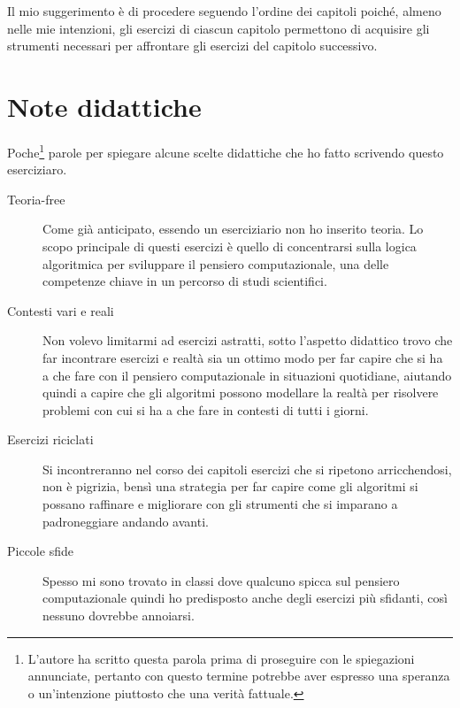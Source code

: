 Il mio suggerimento è di procedere seguendo l'ordine dei capitoli poiché, almeno nelle mie intenzioni, gli esercizi di ciascun capitolo permettono di acquisire gli strumenti necessari per affrontare gli esercizi del capitolo successivo.

\chapter*{Note didattiche}
Poche\footnote{L'autore ha scritto questa parola prima di proseguire con le spiegazioni annunciate, pertanto con questo termine potrebbe aver espresso una speranza o un'intenzione piuttosto che una verità fattuale.} parole per spiegare alcune scelte didattiche che ho fatto scrivendo questo eserciziaro.

\begin{description}
	\item[Teoria-free] Come già anticipato, essendo un eserciziario non ho inserito teoria. Lo scopo principale di questi esercizi è quello di concentrarsi sulla logica algoritmica per sviluppare il pensiero computazionale, una delle competenze chiave in un percorso di studi scientifici.
	\item[Contesti vari e reali] Non volevo limitarmi ad esercizi astratti, sotto l'aspetto didattico trovo che far incontrare esercizi e realtà sia un ottimo modo per far capire che si ha a che fare con il pensiero computazionale in situazioni quotidiane, aiutando quindi a capire che gli algoritmi possono modellare la realtà per risolvere problemi con cui si ha a che fare in contesti di tutti i giorni.
	\item[Esercizi riciclati] Si incontreranno nel corso dei capitoli esercizi che si ripetono arricchendosi, non è pigrizia, bensì una strategia per far capire come gli algoritmi si possano raffinare e migliorare con gli strumenti che si imparano a padroneggiare andando avanti.
	\item[Piccole sfide] Spesso mi sono trovato in classi dove qualcuno spicca sul pensiero computazionale quindi ho predisposto anche degli esercizi più sfidanti, così nessuno dovrebbe annoiarsi.
\end{description}

\endgroup